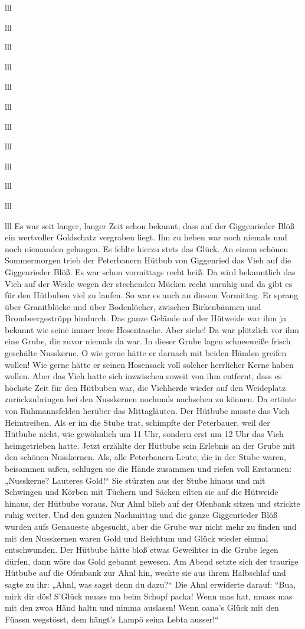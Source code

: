 \documentclass[12pt,a4pager]{book}
\begin{document}
\begin{tabuluar}{lll}
\begin{tabuluar}{lll}
\begin{tabuluar}{lll}
\begin{tabuluar}{lll}
\begin{tabuluar}{lll}
\begin{tabuluar}{lll}
\begin{tabuluar}{lll}
\begin{tabuluar}{lll}
\begin{tabuluar}{lll}
\begin{tabuluar}{lll}
\begin{tabuluar}{lll}
\begin{tabuluar}{lll}
Es war seit langer, langer Zeit schon bekannt, dass auf der Giggenrieder Blöß
ein wertvoller Goldschatz vergraben liegt. Ihn zu heben war noch niemals und
noch niemanden gelungen. Es fehlte hierzu stets das Glück. An einem schönen
Sommermorgen trieb der Peterbauern Hütbub von Giggenried das Vieh auf die
Giggenrieder Blöß. Es war schon vormittags recht heiß. Da wird bekanntlich das
Vieh auf der Weide wegen der stechenden Mücken recht unruhig und da gibt es für
den Hütbuben viel zu laufen. So war es auch an diesem Vormittag. Er sprang über
Granitblöcke und über Bodenlöcher, zwischen Birkenbäumen und Brombeergestrüpp
hindurch. Das ganze Gelände auf der Hütweide war ihm ja bekannt wie seine immer
leere Hosentasche. Aber siehe! Da war plötzlich vor ihm eine Grube, die zuvor
niemals da war. In dieser Grube lagen schneeweiße frisch geschälte Nusskerne. O
wie gerne hätte er darnach mit beiden Händen greifen wollen! Wie gerne hätte er
seinen Hosensack voll solcher herrlicher Kerne haben wollen. Aber das Vieh hatte
sich inzwischen soweit von ihm entfernt, dass es höchste Zeit für den Hütbuben
war, die Viehherde wieder auf den Weideplatz zurückzubringen bei den Nusskernen
nochmals nachsehen zu können. Da ertönte von Ruhmannsfelden herüber das
Mittagläuten. Der Hütbube musste das Vieh Heimtreiben. Als er im die Stube trat,
schimpfte der Peterbauer, weil der Hütbube nicht, wie gewöhnlich um 11 Uhr,
sondern erst um 12 Uhr das Vieh heimgetrieben hatte. Jetzt erzählte der Hütbube
sein Erlebnis an der Grube mit den schönen Nusskernen. Als, alle
Peterbauern-Leute, die in der Stube waren, beisammen saßen, schlugen sie die
Hände zusammen und riefen voll Erstaunen: „Nusskerne? Lauteres Gold!“ Sie
stürzten aus der Stube hinaus und mit Schwingen und Körben mit Tüchern und
Säcken eilten sie auf die Hütweide hinaus, der Hütbube voraus. Nur Ahnl blieb
auf der Ofenbank sitzen und strickte ruhig weiter. Und den ganzen Nachmittag und
die ganze Giggenrieder Blöß wurden aufs Genaueste abgesucht, aber die Grube war
nicht mehr zu finden und mit den Nusskernen waren Gold und Reichtum und Glück
wieder einmal entschwunden. Der Hütbube hätte bloß etwas Geweihtes in die Grube
legen dürfen, dann wäre das Gold gebannt gewesen. Am Abend setzte sich der
traurige Hütbube auf die Ofenbank zur Ahnl hin, weckte sie aus ihrem Halbschlaf
und sagte zu ihr: „Ahnl, was sagst denn du dazu?“ Die Ahnl erwiderte darauf:
“Bua, mirk dir dös! S'Glück muass ma beim Schopf packa! Wenn mas hat, muass mas
mit den zwoa Händ haltn und nimma auslassn! Wenn oana's Glück mit den Füassn
wegstösst, dem hängt's Lampö seina Lebta ausser!“


\end{tabuluar}
\end{tabuluar}
\end{tabuluar}
\end{tabuluar}
\end{tabuluar}
\end{tabuluar}
\end{tabuluar}
\end{tabuluar}
\end{tabuluar}
\end{tabuluar}
\end{tabuluar}
\end{tabuluar}
\end{document}
